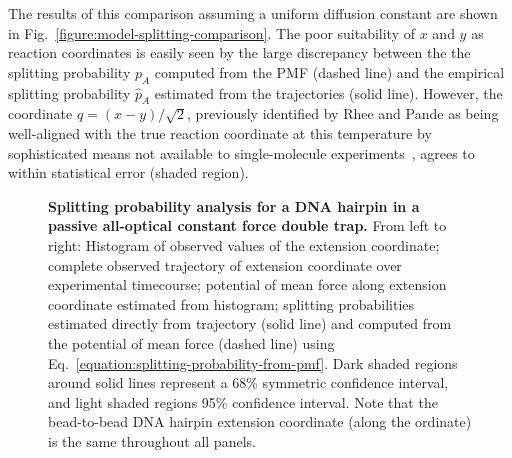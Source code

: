 \documentclass[aps,prl,twocolumn,superscriptaddress,floatfix]{revtex4-1}
\begin{document}
The results of this comparison assuming a uniform diffusion constant are shown in Fig.~\ref{figure:model-splitting-comparison}.
The poor suitability of $x$ and $y$ as reaction coordinates is easily seen by the large discrepancy between the the splitting probability $p_A$ computed from the PMF (dashed line) and the empirical splitting probability $\hat{p}_A$ estimated from the trajectories (solid line).
However, the coordinate $q = (x - y)/\sqrt{2}$, previously identified by Rhee and Pande as being well-aligned with the true reaction coordinate at this temperature by sophisticated means not available to single-molecule experiments~\cite{rhee:jpcb:2005:splitting-probability}, agrees to within statistical error (shaded region).


\begin{figure}[tbp]
\noindent
\caption{\label{figure:dna-hairpin} {\bf Splitting probability analysis for a DNA hairpin in a passive all-optical constant force double trap.}
From left to right: Histogram of observed values of the extension coordinate; 
complete observed trajectory of extension coordinate over experimental timecourse; 
potential of mean force along extension coordinate estimated from histogram; 
splitting probabilities estimated directly from trajectory (solid line) and computed from the potential of mean force (dashed line) using Eq.~\ref{equation:splitting-probability-from-pmf}.
Dark shaded regions around solid lines represent a 68\% symmetric confidence interval, and light shaded regions 95\% confidence interval.
Note that the bead-to-bead DNA hairpin extension coordinate (along the ordinate) is the same throughout all panels. 
} 
\end{figure}
\end{document}

